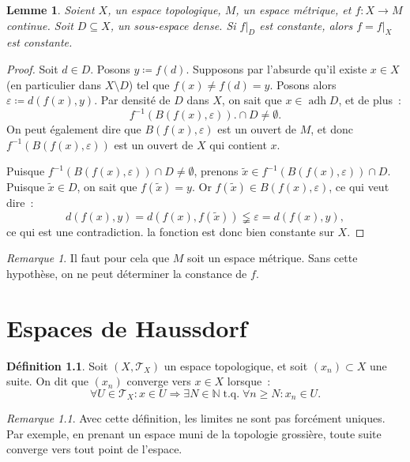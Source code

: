 \documentclass{report}
\newtheorem{lem}[thm]{Lemme}
\theoremstyle{definition}
\newtheorem{déf}[thm]{Définition}
\theoremstyle{remark}
\newtheorem*{rmq}{Remarque}
\DeclareMathOperator{\tq}{\text{ t.q. }}
\DeclareMathOperator{\adh}{adh}
\newcommand{\restr}[2]{\left.#1\right|_{#2}}
\newcommand{\N}{\mathbb N}
\renewcommand{\top}{\mathcal T}
\begin{document}
		\begin{lem} Soient $X$, un espace topologique, $M$, un espace métrique, et $f : X \to M$ continue. Soit $D \subseteq X$, un sous-espace dense. Si $\restr fD$
		est constante, alors $f = \restr fX$ est constante.
		\end{lem}

		\begin{proof} Soit $d \in D$. Posons $y \coloneqq f(d)$. Supposons par l'absurde qu'il existe $x \in X$ (en particulier dans $X \setminus D$) tel que
		$f(x) \neq f(d) = y$. Posons alors $\varepsilon \coloneqq d(f(x), y)$. Par densité de $D$ dans $X$, on sait que $x \in \adh D$, et de plus~:
		\[f^{-1}\left(B(f(x), \varepsilon)\right). \cap D \neq \emptyset.\]
		On peut également dire que $B(f(x), \varepsilon)$ est un ouvert de $M$, et donc $f^{-1}\left(B(f(x), \varepsilon)\right)$ est un ouvert de $X$ qui contient $x$.

		Puisque $f^{-1}\left(B(f(x), \varepsilon)\right) \cap D \neq \emptyset$, prenons $\widetilde x \in f^{-1}\left(B(f(x), \varepsilon)\right) \cap D$. Puisque
		$\widetilde x \in D$, on sait que $f(\widetilde x) = y$. Or $f(\widetilde x) \in B(f(x), \varepsilon)$, ce qui veut dire~:
		\[d(f(x), y) = d(f(x), f(\widetilde x)) \lneqq \varepsilon = d(f(x), y),\]
		ce qui est une contradiction. la fonction est donc bien constante sur $X$.
		\end{proof}

		\begin{rmq} Il faut pour cela que $M$ soit un espace métrique. Sans cette hypothèse, on ne peut déterminer la constance de $f$.
		\end{rmq}

\chapter{Espaces de Haussdorf}
	\begin{déf} Soit $(X, \top_X)$ un espace topologique, et soit $(x_n) \subset X$ une suite. On dit que $(x_n)$ converge vers $x \in X$ lorsque~:
	\[\forall U \in \top_X : x \in U \Rightarrow \exists N \in \N \tq \forall n \geq N : x_n \in U.\]
	\end{déf}

	\begin{rmq} Avec cette définition, les limites ne sont pas forcément uniques. Par exemple, en prenant un espace muni de la topologie grossière, toute suite
	converge vers tout point de l'espace.
	\end{rmq}
\end{document}

